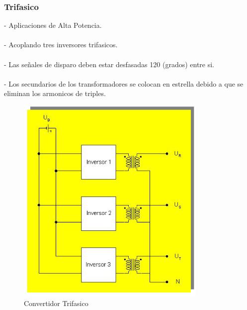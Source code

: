\documentclass[11pt]{article}
\begin{document}
\subsubsection{Trifasico}
- Aplicaciones de Alta Potencia.\\\\- Acoplando tres inversores trifasicos.\\\\- Las señales de disparo deben estar desfasadas 120 (grados) entre si.\\\\- Los secundarios de los transformadores se colocan en estrella debido a que se eliminan los armonicos de triples.
\begin{center}
\begin{figure}[htp]
\centering
\includegraphics[scale=0.70]{Convertidor Trifasico.png}
\caption{Convertidor Trifasico}
\label{}
\end{figure}
\end{center}
\end{document}
